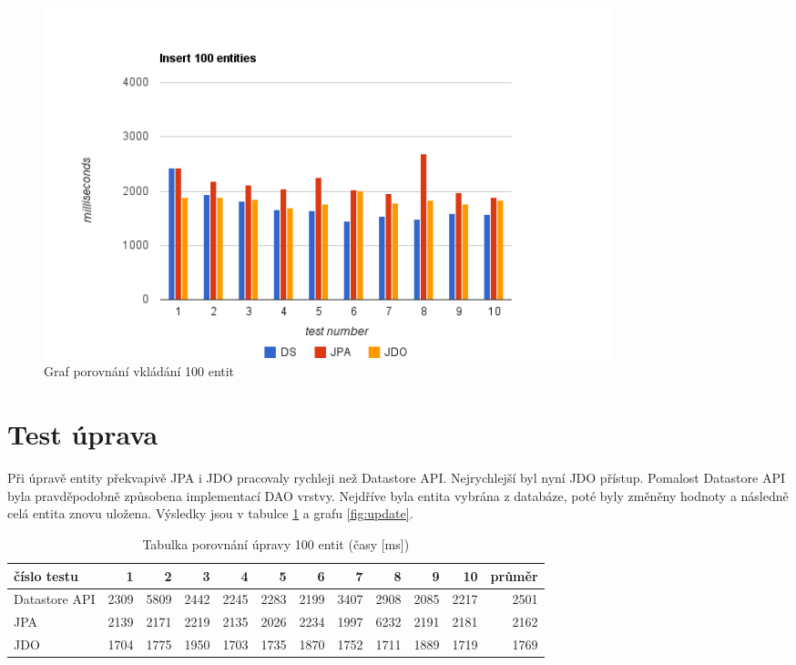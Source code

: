 \begin{figure}[h]
\begin{center}
\includegraphics[width=6.5in]{figures/insert.png}
\caption{Graf porovnání vkládání 100 entit}
\label{fig:insert}
\end{center}
\end{figure}

\section{Test úprava}

Při úpravě entity překvapivě JPA i JDO pracovaly rychleji než Datastore API. Nejrychlejší byl nyní JDO přístup. Pomalost Datastore API byla pravděpodobně způsobena implementací DAO vrstvy. Nejdříve byla entita vybrána z databáze, poté byly změněny hodnoty a následně celá entita znovu uložena. Výsledky jsou v tabulce \ref{tab:update} a grafu \ref{fig:update}.

\begin{table}[h]
\centering
\caption{Tabulka porovnání úpravy 100 entit  (časy [ms])}\label{tab:update}
\begin{tabular}{|l|r|r|r|r|r|r|r|r|r|r|r|}
   \hline
číslo testu	& 1		& 2		& 3		& 4		& 5		& 6		& 7		& 8		& 9		& 10		& průměr \\
   \hline
Datastore API	& 2309	& 5809	& 2442	& 2245	& 2283	& 2199	& 3407	& 2908	& 2085	& 2217	& 2501 \\
JPA	& 2139	& 2171	& 2219	& 2135	& 2026	& 2234	& 1997	& 6232	& 2191	& 2181	& 2162 \\
JDO	& 1704	& 1775	& 1950	& 1703	& 1735	& 1870	& 1752	& 1711	& 1889	& 1719	& 1769 \\
   \hline
\end{tabular}
\end{table}

